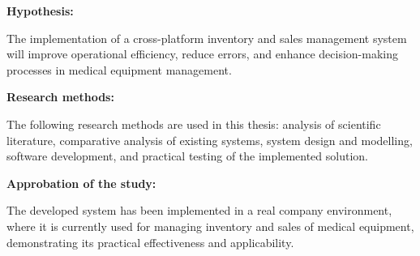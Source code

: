 \textbf{Hypothesis:}  

The implementation of a cross-platform inventory and sales management system will improve operational efficiency, reduce errors, and enhance decision-making processes in medical equipment management.

\textbf{Research methods:}  

The following research methods are used in this thesis: analysis of scientific literature, comparative analysis of existing systems, system design and modelling, software development, and practical testing of the implemented solution.

\textbf{Approbation of the study:}  

The developed system has been implemented in a real company environment, where it is currently used for managing inventory and sales of medical equipment, demonstrating its practical effectiveness and applicability.
